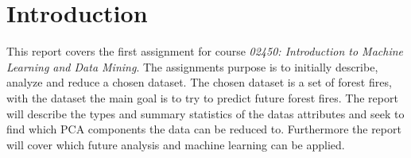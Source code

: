 \section{Introduction}
\label{sec:intro}

This report covers the first assignment for course \textit{02450: Introduction to Machine Learning and Data Mining}. The assignments purpose is to initially describe, analyze and reduce a chosen dataset. The chosen dataset is a set of forest fires, with the dataset the main goal is to try to predict future forest fires. The report will describe the types and summary statistics of the datas attributes and seek to find which PCA components the data can be reduced to. Furthermore the report will cover which future analysis and machine learning can be applied.